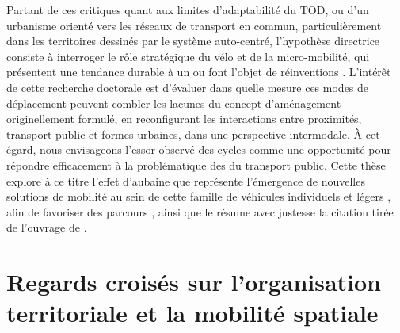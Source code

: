 \begin{refsegment}
Partant de ces critiques quant aux limites d'adaptabilité du \acrshort{TOD}, ou d'un urbanisme orienté vers les réseaux de \gls{transport en commun}, particulièrement dans les territoires dessinés par le système auto-centré, l'hypothèse directrice consiste à interroger le rôle stratégique du vélo et de la \gls{micro-mobilité}, qui présentent une tendance durable à un  \textcolor{blue}{\autocites[137-168]{heran_retour_2015}[3-28]{dusong_dynamiques_2021}[44]{eskenazi_voir_2022}} ou font l'objet de réinventions \textcolor{blue}{\autocite[18]{amar_homo_2016}}. L'intérêt de cette recherche doctorale est d'évaluer dans quelle mesure ces modes de déplacement peuvent combler les lacunes du concept d'aménagement originellement formulé, en reconfigurant les interactions entre proximités, transport public et formes urbaines, dans une perspective intermodale. À cet égard, nous envisageons l'essor observé des cycles comme une opportunité pour répondre efficacement à la problématique des  du transport public. Cette thèse explore à ce titre l'effet d'aubaine que représente l'émergence de nouvelles solutions de mobilité au sein de cette famille de véhicules individuels et légers \textcolor{blue}{\autocite[77]{oostendorp_combining_2018}}, afin de favoriser des parcours , ainsi que le résume avec justesse la citation tirée de l'ouvrage de \textcolor{blue}{\textcite[164-168]{bruntlett_curbing_2020}}.%

\section*{Regards croisés sur l’organisation territoriale et la mobilité spatiale
    \label{introduction-generale:regards-croises-organisation-territoriale-mobilite-spatiale}
    }


\end{refsegment}
